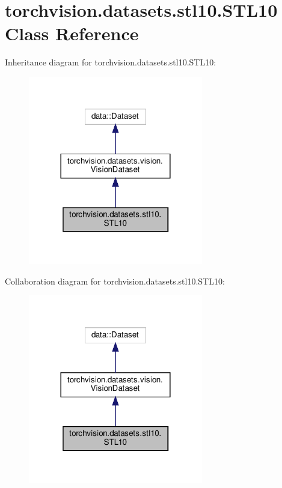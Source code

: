 \hypertarget{classtorchvision_1_1datasets_1_1stl10_1_1STL10}{}\section{torchvision.\+datasets.\+stl10.\+S\+T\+L10 Class Reference}
\label{classtorchvision_1_1datasets_1_1stl10_1_1STL10}


Inheritance diagram for torchvision.\+datasets.\+stl10.\+S\+T\+L10\+:
\nopagebreak
\begin{figure}[H]
\begin{center}
\leavevmode
\includegraphics[width=216pt]{classtorchvision_1_1datasets_1_1stl10_1_1STL10__inherit__graph}
\end{center}
\end{figure}


Collaboration diagram for torchvision.\+datasets.\+stl10.\+S\+T\+L10\+:
\nopagebreak
\begin{figure}[H]
\begin{center}
\leavevmode
\includegraphics[width=216pt]{classtorchvision_1_1datasets_1_1stl10_1_1STL10__coll__graph}
\end{center}
\end{figure}
